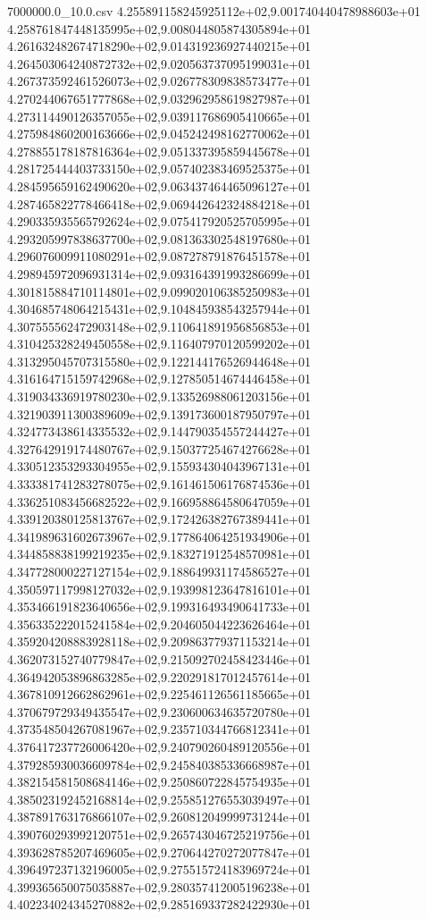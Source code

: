 \begin{filecontents*}{7000000.0_10.0.csv}
4.255891158245925112e+02,9.001740440478988603e+01
4.258761847448135995e+02,9.008044805874305894e+01
4.261632482674718290e+02,9.014319236927440215e+01
4.264503064240872732e+02,9.020563737095199031e+01
4.267373592461526073e+02,9.026778309838573477e+01
4.270244067651777868e+02,9.032962958619827987e+01
4.273114490126357055e+02,9.039117686905410665e+01
4.275984860200163666e+02,9.045242498162770062e+01
4.278855178187816364e+02,9.051337395859445678e+01
4.281725444403733150e+02,9.057402383469525375e+01
4.284595659162490620e+02,9.063437464465096127e+01
4.287465822778466418e+02,9.069442642324884218e+01
4.290335935565792624e+02,9.075417920525705995e+01
4.293205997838637700e+02,9.081363302548197680e+01
4.296076009911080291e+02,9.087278791876451578e+01
4.298945972096931314e+02,9.093164391993286699e+01
4.301815884710114801e+02,9.099020106385250983e+01
4.304685748064215431e+02,9.104845938543257944e+01
4.307555562472903148e+02,9.110641891956856853e+01
4.310425328249450558e+02,9.116407970120599202e+01
4.313295045707315580e+02,9.122144176526944648e+01
4.316164715159742968e+02,9.127850514674446458e+01
4.319034336919780230e+02,9.133526988061203156e+01
4.321903911300389609e+02,9.139173600187950797e+01
4.324773438614335532e+02,9.144790354557244427e+01
4.327642919174480767e+02,9.150377254674276628e+01
4.330512353293304955e+02,9.155934304043967131e+01
4.333381741283278075e+02,9.161461506176874536e+01
4.336251083456682522e+02,9.166958864580647059e+01
4.339120380125813767e+02,9.172426382767389441e+01
4.341989631602673967e+02,9.177864064251934906e+01
4.344858838199219235e+02,9.183271912548570981e+01
4.347728000227127154e+02,9.188649931174586527e+01
4.350597117998127032e+02,9.193998123647816101e+01
4.353466191823640656e+02,9.199316493490641733e+01
4.356335222015241584e+02,9.204605044223626464e+01
4.359204208883928118e+02,9.209863779371153214e+01
4.362073152740779847e+02,9.215092702458423446e+01
4.364942053896863285e+02,9.220291817012457614e+01
4.367810912662862961e+02,9.225461126561185665e+01
4.370679729349435547e+02,9.230600634635720780e+01
4.373548504267081967e+02,9.235710344766812341e+01
4.376417237726006420e+02,9.240790260489120556e+01
4.379285930036609784e+02,9.245840385336668987e+01
4.382154581508684146e+02,9.250860722845754935e+01
4.385023192452168814e+02,9.255851276553039497e+01
4.387891763176866107e+02,9.260812049999731244e+01
4.390760293992120751e+02,9.265743046725219756e+01
4.393628785207469605e+02,9.270644270272077847e+01
4.396497237132196005e+02,9.275515724183969724e+01
4.399365650075035887e+02,9.280357412005196238e+01
4.402234024345270882e+02,9.285169337282422930e+01

\end{filecontents*}
